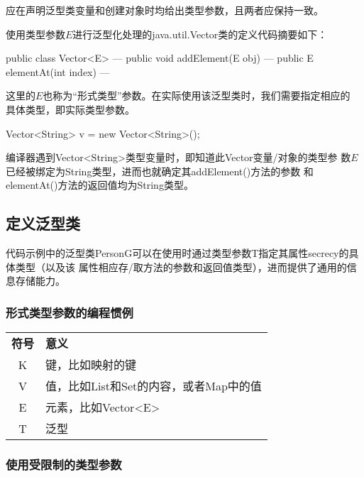 
应在声明泛型类变量和创建对象时均给出类型参数，且两者应保持一致。

使用类型参数$E$进行泛型化处理的java.util.Vector类的定义代码摘要如下：

\begin{javaCode}
  public class Vector<E> --- {
    public void addElement(E obj) { --- }
    public E elementAt(int index) { --- }
  }  
\end{javaCode}

这里的$E$也称为“形式类型”参数。在实际使用该泛型类时，我们需要指定相应的
具体类型，即实际类型参数。
  
\begin{javaCode}
  Vector<String> v = new Vector<String>();
\end{javaCode}

编译器遇到Vector<String>类型变量时，即知道此Vector变量/对象的类型参
数$E$已经被绑定为String类型，进而也就确定其addElement()方法的参数
和elementAt()方法的返回值均为String类型。

\subsection{定义泛型类}


{\kai 代码示例中的泛型类PersonG可以在使用时通过类型参数T指定其属性secrecy的具体类型（以及该
  属性相应存/取方法的参数和返回值类型），进而提供了通用的信息存储能力。}

\subsubsection{形式类型参数的编程惯例}

\begin{table}
  \footnotesize
  \begin{tabular}{c|p{6cm}}
    {\bf 符号} & {\bf 意义}  \\
    K & 键，比如映射的键\\
    V & 值，比如List和Set的内容，或者Map中的值\\
    E & 元素，比如Vector<E>\\
    T & 泛型\\
  \end{tabular}
\end{table}

\subsubsection{使用受限制的类型参数}

